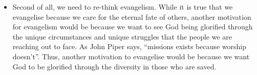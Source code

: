 \begin{itemize}
  \item{Second of all, we need to re-think evangelism. While it is true that we evangelise because we care for the eternal fate of others, another motivation for evangelism would be because we want to see God being glorified through the unique circumstances and unique struggles that the people we are reaching out to face. As John Piper says, “missions exists because worship doesn’t”. Thus, another motivation to evangelise would be because we want God to be glorified through the diversity in those who are saved.}
\end{itemize}